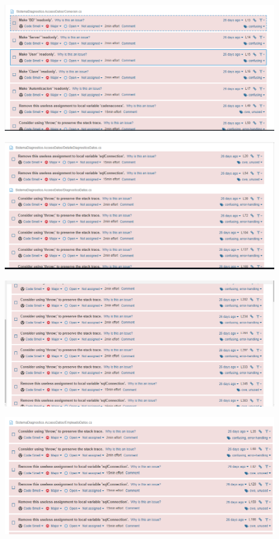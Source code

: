 \documentclass[preprint,12pt]{elsarticle}
\begin{document}
\begin{itemize}
\begin{center}
\end{center}
\begin{center}
	\includegraphics[width=12cm]{./imagen/foto3.png}
\end{center}
\begin{center}
	\includegraphics[width=12cm]{./imagen/foto4.png}
\end{center}
\begin{center}
	\includegraphics[width=12cm]{./imagen/foto5.png}
\end{center}
\begin{center}
	\includegraphics[width=12cm]{./imagen/foto6.png}

\end{center}
\end{itemize}
\end{document}
